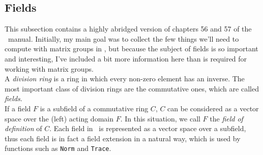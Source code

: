 \subsection{Fields}
This subsection contains a highly abridged version of chapters 56 and 57 of the \gap\
manual.  Initially, my main goal was to collect the few things we'll need to compute
with matrix groups in \gap, but because the subject of fields is so important and
interesting, I've included a bit more information here than is required for working
with matrix groups.
\\[4pt]
A \emph{division ring} is a ring in which every non-zero element has an inverse. The most
important class of division rings are the commutative ones, which are called \emph{fields}.
\\[4pt]
If a field $F$ is a subfield of a commutative ring $C$, $C$ can be considered as a
vector space over the (left) acting domain $F$. In this situation, we call $F$ the
\emph{field of definition} of $C$. Each field in \gap\ is represented as a vector
space over a subfield, thus each field is in fact a field extension in a natural way,
which is used by functions such as {\tt Norm} and {\tt Trace}.
